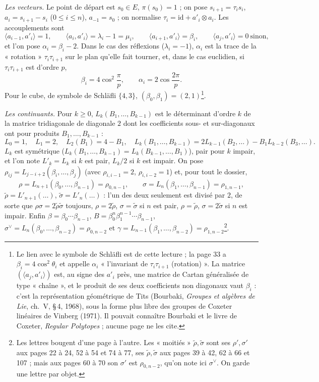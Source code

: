 \documentclass[11pt,a4paper]{article}
\begin{document}
\emph{Les vecteurs.} Le point de départ est $s_0 \in E$, $\pi(s_0) = 1$ ; on
pose $s_{i+1} = \tau_i s_i$, $a_i = s_{i+1} - s_i$ ($0 \leqslant i \leqslant
n$), $a_{-1} = s_0$ ; on normalise $\tau_i = \mathrm{id} + a'_i \otimes a_i$.
Les accouplements sont
\[
\langle a_{i-1}, a'_i \rangle = 1, \qquad
\langle a_i, a'_i \rangle = \lambda_i - 1 = \mu_i, \qquad
\langle a_{i+1}, a'_i \rangle = \beta_i, \qquad
\langle a_j, a'_i \rangle = 0 \ \text{sinon},
\]
et l'on pose $\alpha_i = \beta_i - 2$. Dans le cas des réflexions ($\lambda_i
= -1$), $\alpha_i$ est la trace de la « rotation » $\tau_i\tau_{i+1}$ sur le
plan qu'elle fait tourner, et, dans le cas euclidien, si $\tau_i\tau_{i+1}$
est d'ordre $p$,
\[
\beta_i = 4\cos^2\frac{\pi}{p}, \qquad \alpha_i = 2\cos\frac{2\pi}{p}.
\]
Pour le cube, de symbole de Schläfli $\{4, 3\}$, $(\beta_0, \beta_1) = (2,
1)$\footnote{Le lien avec le symbole de Schläfli est de cette lecture ; la
page 33 a $\beta_i = 4\cos^2\theta_i$ et appelle $\alpha_i$
« l'invariant de $\tau_i\tau_{i+1}$ (rotation) ». La matrice $(\langle a_j,
a'_i \rangle)$ est, au signe des $a'_i$ près, une matrice de Cartan
généralisée de type « chaîne », et le produit de ses deux coefficients non
diagonaux vaut $\beta_i$ : c'est la représentation géométrique de Tits
(Bourbaki, \emph{Groupes et algèbres de Lie}, ch.~V, §\,4, 1968), sous la forme
plus libre des groupes de Coxeter linéaires de Vinberg (1971). Il pouvait
connaître Bourbaki et le livre de Coxeter, \emph{Regular Polytopes} ; aucune
page ne les cite.}.

\emph{Les continuants.} Pour $k \geqslant 0$, $L_k(B_1, \ldots, B_{k-1})$ est
le déterminant d'ordre $k$ de la matrice tridiagonale de diagonale $2$ dont
les coefficients sous- et sur-diagonaux ont pour produits $B_1, \ldots,
B_{k-1}$ :
\[
L_0 = 1, \quad L_1 = 2, \quad L_2(B_1) = 4 - B_1, \quad
L_k(B_1, \ldots, B_{k-1}) = 2L_{k-1}(B_2, \ldots) - B_1 L_{k-2}(B_3, \ldots).
\]
$L_k$ est symétrique ($L_k(B_1, \ldots, B_{k-1}) = L_k(B_{k-1}, \ldots, B_1)$),
pair pour $k$ impair, et l'on note $L'_k = L_k$ si $k$ est pair, $L_k/2$ si
$k$ est impair. On pose $\rho_{ij} = L_{j-i+2}(\beta_i, \ldots, \beta_j)$ (avec
$\rho_{i,i-1} = 2$, $\rho_{i,i-2} = 1$) et, pour tout le dossier,
\[
\rho = L_{n+1}(\beta_0, \ldots, \beta_{n-1}) = \rho_{0,n-1}, \qquad
\sigma = L_n(\beta_1, \ldots, \beta_{n-1}) = \rho_{1,n-1},
\]
$\tilde\rho = L'_{n+1}(\ldots)$, $\tilde\sigma = L'_n(\ldots)$ : l'un des deux
seulement est divisé par $2$, de sorte que $\rho\sigma = 2\tilde\rho\tilde\sigma$
toujours, $\rho = 2\tilde\rho$, $\sigma = \tilde\sigma$ si $n$ est pair, $\rho
= \tilde\rho$, $\sigma = 2\tilde\sigma$ si $n$ est impair. Enfin $\beta =
\beta_0 \cdots \beta_{n-1}$, $B = \beta_0^n \beta_1^{n-1} \cdots \beta_{n-1}$,
$\sigma^\vee = L_n(\beta_0, \ldots, \beta_{n-2}) = \rho_{0,n-2}$ et $\gamma =
L_{n-1}(\beta_1, \ldots, \beta_{n-2}) = \rho_{1,n-2}$\footnote{Les lettres
bougent d'une page à l'autre. Les « moitiés » $\tilde\rho, \tilde\sigma$ sont
ses $\rho', \sigma'$ aux pages 22 à 24, 52 à 54 et 74 à 77, ses $\tilde\rho,
\tilde\sigma$ aux pages 39 à 42, 62 à 66 et 107 ; mais aux pages 60 à 70 son
$\sigma'$ est $\rho_{0,n-2}$, qu'on note ici $\sigma^\vee$. On garde une lettre
par objet.}.
\end{document}
